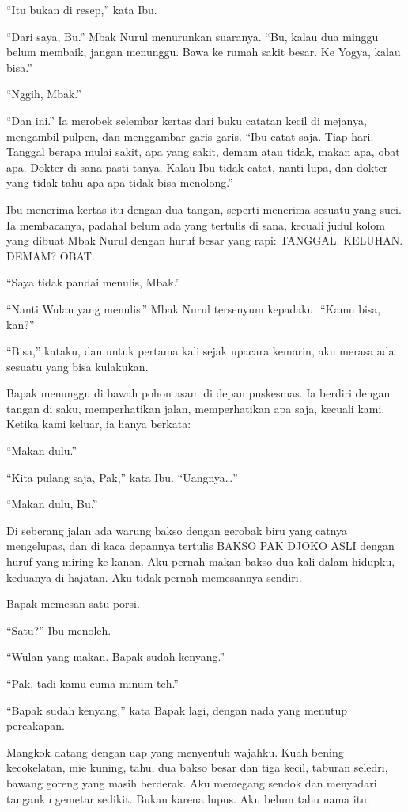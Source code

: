 \documentclass[11pt,twoside,openany]{book}
\makeatletter
\newcommand{\scenebreak}{\par\vspace{0.9em}{\centering\textsc{*\hspace{0.7em}*\hspace{0.7em}*}\par}\vspace{0.9em}\@afterindentfalse\@afterheading}
\makeatother
\begin{document}
``Itu bukan di resep,'' kata Ibu.

``Dari saya, Bu.'' Mbak Nurul menurunkan suaranya. ``Bu, kalau dua minggu belum membaik, jangan menunggu. Bawa ke rumah sakit besar. Ke Yogya, kalau bisa.''

``Nggih, Mbak.''

``Dan ini.'' Ia merobek selembar kertas dari buku catatan kecil di mejanya, mengambil pulpen, dan menggambar garis-garis. ``Ibu catat saja. Tiap hari. Tanggal berapa mulai sakit, apa yang sakit, demam atau tidak, makan apa, obat apa. Dokter di sana pasti tanya. Kalau Ibu tidak catat, nanti lupa, dan dokter yang tidak tahu apa-apa tidak bisa menolong.''

Ibu menerima kertas itu dengan dua tangan, seperti menerima sesuatu yang suci. Ia membacanya, padahal belum ada yang tertulis di sana, kecuali judul kolom yang dibuat Mbak Nurul dengan huruf besar yang rapi: TANGGAL. KELUHAN. DEMAM? OBAT.

``Saya tidak pandai menulis, Mbak.''

``Nanti Wulan yang menulis.'' Mbak Nurul tersenyum kepadaku. ``Kamu bisa, kan?''

``Bisa,'' kataku, dan untuk pertama kali sejak upacara kemarin, aku merasa ada sesuatu yang bisa kulakukan.

\scenebreak
Bapak menunggu di bawah pohon asam di depan puskesmas. Ia berdiri dengan tangan di saku, memperhatikan jalan, memperhatikan apa saja, kecuali kami. Ketika kami keluar, ia hanya berkata:

``Makan dulu.''

``Kita pulang saja, Pak,'' kata Ibu. ``Uangnya\ldots{}''

``Makan dulu, Bu.''

Di seberang jalan ada warung bakso dengan gerobak biru yang catnya mengelupas, dan di kaca depannya tertulis BAKSO PAK DJOKO ASLI dengan huruf yang miring ke kanan. Aku pernah makan bakso dua kali dalam hidupku, keduanya di hajatan. Aku tidak pernah memesannya sendiri.

Bapak memesan satu porsi.

``Satu?'' Ibu menoleh.

``Wulan yang makan. Bapak sudah kenyang.''

``Pak, tadi kamu cuma minum teh.''

``Bapak sudah kenyang,'' kata Bapak lagi, dengan nada yang menutup percakapan.

Mangkok datang dengan uap yang menyentuh wajahku. Kuah bening kecokelatan, mie kuning, tahu, dua bakso besar dan tiga kecil, taburan seledri, bawang goreng yang masih berderak. Aku memegang sendok dan menyadari tanganku gemetar sedikit. Bukan karena lupus. Aku belum tahu nama itu.
\end{document}

